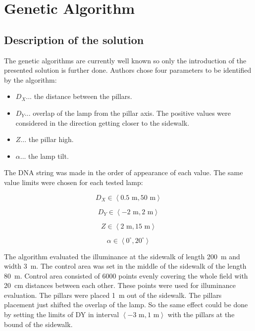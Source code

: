\section{Genetic Algorithm}
\subsection{Description of the solution}
The genetic algorithms are currently well known so only the introduction of the presented solution is further done. Authors chose four parameters to be identified by the algorithm:

\begin{itemize}
	\item $D_X$... the distance between the pillars.
	\item $D_Y$... overlap of the lamp from the pillar axis. The positive values were considered in the direction getting closer to the sidewalk.
	\item $Z$... the pillar high.
	\item $\alpha$... the lamp tilt.
\end{itemize}

The DNA string was made in the order of appearance of each value. The same value limits were chosen for each tested lamp:

\begin{equation}
D_X \in \left\langle 0.5 \text{ m}, 50 \text{ m}\right\rangle
\end{equation}

\begin{equation}
D_Y \in \left\langle -2 \text{ m}, 2 \text{ m}\right\rangle
\end{equation}

\begin{equation}
Z \in \left\langle 2 \text{ m}, 15 \text{ m}\right\rangle
\end{equation}

\begin{equation}
\alpha \in \left\langle 0^\circ, 20^\circ \right\rangle
\end{equation}

The algorithm evaluated the illuminance at the sidewalk of length 200~m and width 3~m. The control area was set in the middle of the sidewalk of the length 80~m. Control area consisted of 6000 points evenly covering the whole field with 20~cm distances between each other. These points were used for illuminance evaluation. The pillars were placed 1~m out of the sidewalk. The pillars placement just shifted the overlap of the lamp. So the same effect could be done by setting the limits of DY in interval $\left\langle -3 \text{ m}, 1 \text{ m}\right\rangle$ with the pillars at the bound of the sidewalk.

